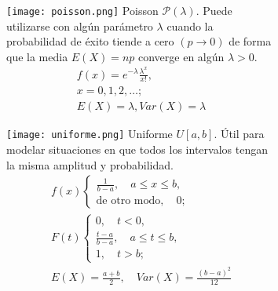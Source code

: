 \begin{figure}[H]
\begin{subfigure}[t]{.475\textwidth}\texttt{[image: poisson.png]}
Poisson $\mathcal{P}(\lambda)$. Puede utilizarse con algún parámetro $\lambda$ cuando la probabilidad de éxito tiende a cero $(p\rightarrow0)$ de forma que la media $E(X)=np$ converge en algún $\lambda>0$.
\begin{equation}\begin{matrix}
f(x)=e^{-\lambda}\frac{\lambda^x}{x!},\\
x=0,1,2,\ldots;\\
E(X)=\lambda, Var(X)=\lambda
\end{matrix}\end{equation}\end{subfigure}\qquad
\begin{subfigure}[t]{.475\textwidth}\texttt{[image: uniforme.png]}
Uniforme $U[a,b]$. Útil para modelar situaciones en que todos los intervalos tengan la misma amplitud y probabilidad.
\begin{equation}\begin{matrix}
f(x)\begin{cases}\frac{1}{b-a},\quad a\leq x\leq b,\\\text{de otro modo},\quad 0;\end{cases}\\
F(t)\begin{cases}0,\quad t<0,\\\frac{t-a}{b-a},\quad a\leq t\leq b,\\1,\quad t>b;\end{cases}\\
E(X)=\frac{a+b}{2},\quad Var(X)=\frac{{(b-a)}^2}{12}
\end{matrix}\end{equation}\end{subfigure}
\end{figure}


